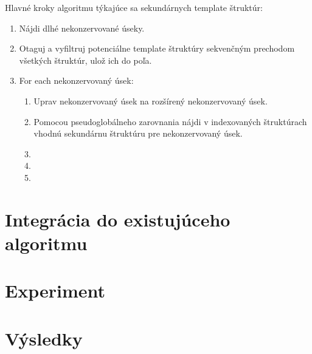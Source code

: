 \indent Hlavné kroky algoritmu týkajúce sa sekundárnych template štruktúr:
\begin{enumerate}
\item Nájdi dlhé nekonzervované úseky.
\item Otaguj a vyfiltruj potenciálne template štruktúry sekvenčným prechodom všetkých štruktúr, ulož  ich do poľa.
\item For each nekonzervovaný úsek:
\begin{enumerate}
\item Uprav nekonzervovaný úsek na rozšírený nekonzervovaný úsek.
\item Pomocou pseudoglobálneho zarovnania nájdi v indexovaných štruktúrach vhodnú sekundárnu štruktúru pre nekonzervovaný úsek.
\item 
\item 
\item
\end{enumerate}
\end{enumerate}

\section{Integrácia do existujúceho algoritmu}


\section{Experiment}


\section{Výsledky}